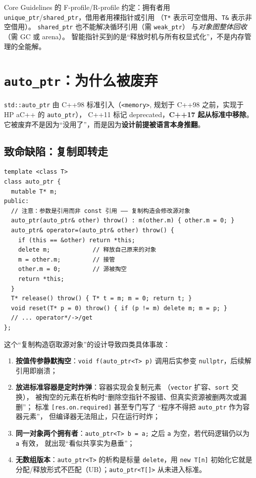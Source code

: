 \documentclass[12pt,a4paper,fontset=fandol]{ctexbook}
\begin{document}
\begin{note}[title=智能指针不是``替代裸指针'']
Core Guidelines 的 F-profile/R-profile 约定：拥有者用
\texttt{unique\_ptr}/\allowbreak{}\texttt{shared\_ptr}，借用者用裸指针或引用
（\texttt{T*} 表示可空借用、\texttt{T\&} 表示非空借用）。
\texttt{shared\_ptr} 也不能解决循环引用（需 \texttt{weak\_ptr}）
与\emph{对象图整体回收}（需 GC 或 arena）。
智能指针买到的是``释放时机与所有权显式化''，不是内存管理的全能解。
\end{note}

\section{\texttt{auto\_ptr}：为什么被废弃}

\texttt{std::auto\_ptr} 由 C++98 标准引入（\texttt{<memory>},
规划于 C++98 之前，实现于 HP aC++ 的 \texttt{auto\_ptr}），
C++11 标记 deprecated，\textbf{C++17 起从标准中移除}。
它被废弃不是因为``没用了''，而是因为\textbf{设计前提被语言本身推翻}。

\subsection{致命缺陷：复制即转走}

\begin{lstlisting}
template <class T>
class auto_ptr {
  mutable T* m;
public:
  // 注意：参数是引用而非 const 引用 —— 复制构造会修改源对象
  auto_ptr(auto_ptr& other) throw() : m(other.m) { other.m = 0; }
  auto_ptr& operator=(auto_ptr& other) throw() {
    if (this == &other) return *this;
    delete m;            // 释放自己原来的对象
    m = other.m;         // 接管
    other.m = 0;         // 源被掏空
    return *this;
  }
  T* release() throw() { T* t = m; m = 0; return t; }
  void reset(T* p = 0) throw() { if (p != m) delete m; m = p; }
  // ... operator*/->/get
};
\end{lstlisting}

这个``复制构造窃取源对象''的设计导致四类具体事故：

\begin{enumerate}
  \item \textbf{按值传参静默掏空}：\texttt{void f(auto\_ptr<T> p)}
        调用后实参变 \texttt{nullptr}，后续解引用即崩溃；
  \item \textbf{放进标准容器是定时炸弹}：容器实现会复制元素
        （\texttt{vector} 扩容、\texttt{sort} 交换），
        被掏空的元素在析构时``删除空指针不报错、但真实资源被删两次或漏删''；
        标准 \texttt{[res.on.required]} 甚至专门写了
        ``程序不得把 \texttt{auto\_ptr} 作为容器元素''，
        但编译器无法阻止，只在运行时炸；
  \item \textbf{同一对象两个拥有者}：\texttt{auto\_ptr<T> b = a;}
        之后 \texttt{a} 为空，若代码逻辑仍以为 \texttt{a} 有效，
        就出现``看似共享实为悬垂''；
  \item \textbf{无数组版本}：\texttt{auto\_ptr<T>} 的析构是标量
        \texttt{delete}，用 \texttt{new T[n]} 初始化它就是
        分配/释放形式不匹配（UB）；\texttt{auto\_ptr<T[]>} 从未进入标准。
\end{enumerate}
\end{document}
